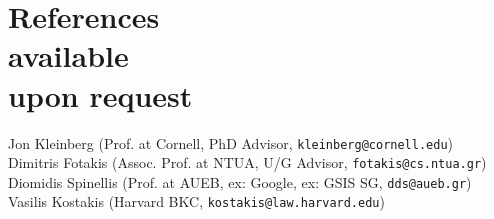 \documentclass[margin, 10pt]{res}
\newcommand{\field}[2]{\noindent \textbf{#1} \hfill #2 \\}
\begin{document}
\begin{resume}
\begin{compactitem}
\end{compactitem}

\section{References \\ available \\ upon request}

Jon Kleinberg \hfill (Prof. at Cornell, PhD Advisor, \texttt{kleinberg@cornell.edu}) \\
Dimitris Fotakis \hfill (Assoc. Prof. at NTUA, U/G Advisor, \texttt{fotakis@cs.ntua.gr}) \\
Diomidis Spinellis \hfill (Prof. at AUEB, ex: Google, ex: GSIS SG, \texttt{dds@aueb.gr}) \\
Vasilis Kostakis \hfill (Harvard BKC, \texttt{kostakis@law.harvard.edu}) \\



\begin{comment}

\section{Selected \\ Projects \& Published \\ Software} 

\field{SADE} {\emph{August 2018 --}}
This project aims to perform software clusterings using vector semantics and the call graphs. The project had successful results on recovering clusters of the Linux Kernel.\\
Repository: \url{https://github.com/papachristoumarios/sade}

\field{3gm -- Google Summer of Code} {\emph{April 2018 -- }}
This project aims to provide an automated codex of the most recent versions of each law in Greek Legislation via NLP methods and practices. Results are published at \url{3gm.ellak.gr}. \\ Repository: \url{https://github.com/eellak/gsoc2018-3gm}


\end{comment}
\end{resume}
\end{document}
